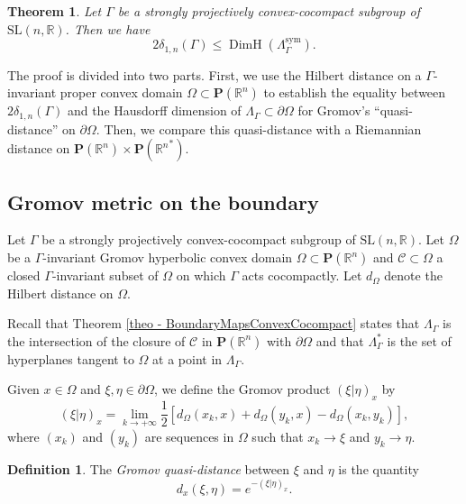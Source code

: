 \documentclass[11pt]{article}
\numberwithin{equation}{section}
\newtheorem{theorem}[theo]{Theorem}
\theoremstyle{definition}
\newtheorem{defi}[theo]{Definition}
\newcommand{\proj}{\mathbf{P}}
\newcommand{\R}{\mathbb{R}}
\newcommand{\cC}{\mathcal{C}}
\newcommand{\SL}{\mathrm{SL}}
\DeclareMathOperator{\DimH}{DimH}
\let\G\Gamma
\begin{document}
\begin{theorem} \label{th - lower bound}
Let $\G$ be a strongly projectively convex-cocompact subgroup of $\SL(n,\R)$. Then we have
\[ 2\delta_{{1,n}}(\G) \leq \DimH(\Lambda^{\mathrm{sym}}_\G). \]
\end{theorem}

The proof is divided into two parts. First, we use the Hilbert distance on a $\G$\nobreakdash-in\-vari\-ant proper convex domain $\Omega\subset\proj(\R^n)$ to establish the equality between $2\delta_{1,n}(\G)$ and the Hausdorff dimension of $\Lambda_\G\subset \partial\Omega$ for Gromov's ``quasi-distance'' on $\partial \Omega$. Then, we compare this quasi-distance with a Riemannian distance on $\proj(\R^n)\times\proj({\R^n}^*)$.

\subsection{Gromov metric on the boundary}\label{subsec-gromov metric on the boundary}
Let $\G$ be a strongly projectively convex-cocompact subgroup of $\SL(n,\R)$. Let $\Omega$ be a $\G$-invariant Gromov hyperbolic convex domain $\Omega\subset\proj(\R^n)$ and $\cC\subset \Omega$ a closed $\G$-invariant subset of $\Omega$ on which $\G$ acts cocompactly. Let $d_\Omega$ denote the Hilbert distance on $\Omega$.

Recall that Theorem \ref{theo - BoundaryMapsConvexCocompact} states that $\Lambda_\Gamma$ is the intersection of the closure of $\cC$ in $\proj(\R^n)$ with $\partial \Omega$ and that $\Lambda_\G^*$ is the set of hyperplanes tangent to $\Omega$ at a point in $\Lambda_\G$.

Given $x\in \Omega$ and $\xi,\eta\in \partial\Omega$, we define the Gromov product $(\xi\vert\eta)_x$ by
\[( \xi \vert \eta)_x = \lim_{k\to +\infty} \frac{1}{2}[ d_\Omega(x_k, x) +d_\Omega(y_k, x) -d_\Omega(x_k, y_k)],\]
where $(x_k)$ and $(y_k)$ are sequences in $\Omega$ such that $x_k \to \xi $ and $y_k\to \eta$.

\begin{defi} \label{def - gromov distance}
The \emph{Gromov quasi-distance} between $\xi$ and $\eta$ is the quantity
\[d_x(\xi, \eta)= e^{-( \xi\vert \eta)_x }.\]
\end{defi}
\end{document}
